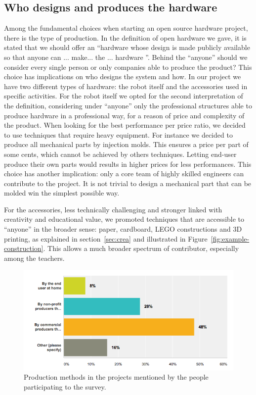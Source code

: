 \documentclass[letterpaper, 10 pt, conference]{ieeeconf}  %
\begin{document}
\subsection{Who designs and produces the hardware}

Among the fundamental choices when starting an open source hardware project, there is the type of production. 
In the definition of open hardware we gave, it is stated that we should offer an ``hardware whose design is made publicly available so that anyone can ... make... the ... hardware ''.
Behind the ``anyone'' should we consider every single person or only companies able to produce the product?
This choice has implications on who designs the system and how.
In our project we have two different types of hardware: the robot itself and the accessories used in specific activities.
For the robot itself we opted for the second interpretation of the definition, considering under ``anyone'' only the professional structures able to produce hardware in a professional way, for a reason of price and complexity of the product. 
When looking for the best performance per price ratio, we decided to use techniques that require heavy equipment.
For instance we decided to produce all mechanical parts by injection molds. 
This ensures a price per part of some cents, which cannot be achieved by others techniques.
Letting end-user produce their own parts would results in higher prices for less performances. 
This choice has another implication: only a core team of highly skilled engineers can contribute to the project. 
It is not trivial to design a mechanical part that can be molded win the simplest possible way.

For the accessories, less technically challenging and stronger linked with creativity and educational value, we promoted techniques that are accessible to ``anyone'' in the broader sense: paper, cardboard, LEGO constructions and 3D printing, as explained in section~\ref{sec:crea} and illustrated in Figure~\ref{fig:example-construction}.
This allows a much broader spectrum of contributor, especially among the teachers.

\begin{figure}
\centering
\includegraphics[width=\columnwidth]{figures/production}
\caption{Production methods in the projects mentioned by the people participating to the survey.}
\label{fig:production}
\end{figure}
\end{document}
